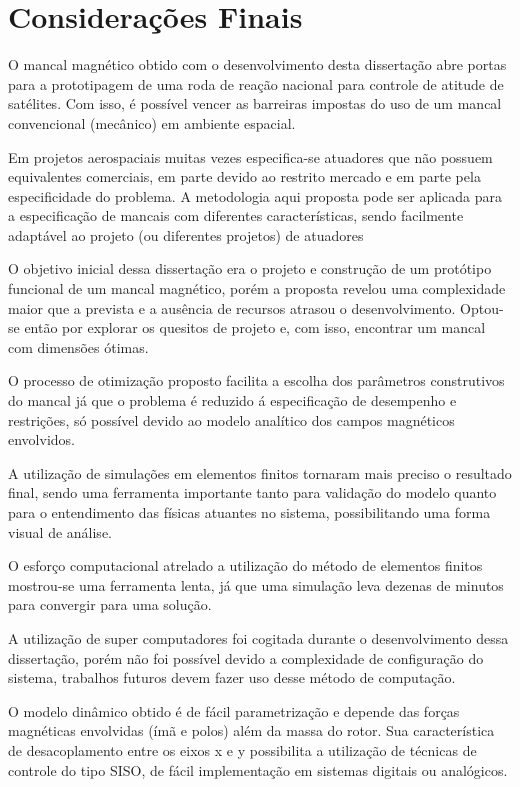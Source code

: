 \pagestyle{empty}
	\cleardoublepage
\pagestyle{fancy}

\chapter{Considerações Finais} \label{Cap:Consideracoes:Finais}

O mancal magnético obtido com o desenvolvimento desta dissertação abre portas para a prototipagem de uma roda de reação nacional para controle de atitude de satélites. Com isso, é possível vencer as barreiras impostas do uso de um mancal convencional (mecânico) em ambiente espacial.

Em projetos aerospaciais muitas vezes especifica-se atuadores que não possuem equivalentes comerciais, em parte devido ao restrito mercado e em parte pela especificidade do problema. A metodologia aqui proposta pode ser aplicada para a especificação de mancais com diferentes características, sendo facilmente adaptável ao projeto (ou diferentes projetos) de atuadores

O objetivo inicial dessa dissertação era o projeto e construção de um protótipo funcional de um mancal magnético, porém a proposta revelou uma complexidade maior que a prevista e a ausência de recursos atrasou o desenvolvimento. Optou-se então por explorar os quesitos de projeto e, com isso, encontrar um mancal com dimensões ótimas. 

O processo de otimização proposto facilita a escolha dos parâmetros construtivos do mancal já que o problema é reduzido á especificação de desempenho e restrições, só possível devido ao modelo analítico dos campos magnéticos envolvidos.

A utilização de simulações em elementos finitos tornaram mais preciso o resultado final, sendo uma ferramenta importante tanto para validação do modelo quanto para o entendimento das físicas atuantes no sistema, possibilitando uma forma visual de análise. 

O esforço computacional atrelado a utilização do método de elementos finitos mostrou-se uma ferramenta lenta, já que uma simulação leva dezenas de minutos para convergir para uma solução.

A utilização de super computadores foi cogitada durante o desenvolvimento dessa dissertação, porém não foi possível devido a complexidade de configuração do sistema, trabalhos futuros devem fazer uso desse método de computação.

O modelo dinâmico obtido é de fácil parametrização e depende das forças magnéticas envolvidas (ímã e polos) além da massa do rotor. Sua característica de desacoplamento entre os eixos x e y possibilita a utilização de técnicas de controle do tipo SISO, de fácil implementação em sistemas digitais ou analógicos.

